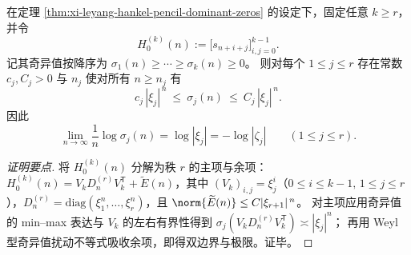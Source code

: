 \begin{theorem}\label{thm:xi-leyang-hankel-singular-slope-detects-moduli}
在定理 \ref{thm:xi-leyang-hankel-pencil-dominant-zeros} 的设定下，固定任意 \(k\ge r\)，并令
\[
H_0^{(k)}(n):=\bigl[s_{n+i+j}\bigr]_{i,j=0}^{k-1}.
\]
记其奇异值按降序为 \(\sigma_1(n)\ge\cdots\ge\sigma_k(n)\ge 0\)。
则对每个 \(1\le j\le r\) 存在常数 \(c_j,C_j>0\) 与 \(n_j\) 使对所有 \(n\ge n_j\) 有
\[
c_j\,|\xi_j|^{\,n}\ \le\ \sigma_j(n)\ \le\ C_j\,|\xi_j|^{\,n}.
\]
因此
\[
\lim_{n\to\infty}\frac{1}{n}\log\sigma_j(n)=\log|\xi_j|=-\log|\zeta_j|\qquad(1\le j\le r).
\]
\end{theorem}
\begin{proof}[证明要点]
将 \(H_0^{(k)}(n)\) 分解为秩 \(r\) 的主项与余项：
\(
H_0^{(k)}(n)=V_k D_n^{(r)} V_k^{\mathsf T}+\widetilde E(n)
\)，其中 \((V_k)_{i,j}=\xi_j^i\)（\(0\le i\le k-1,\,1\le j\le r\)），\(D_n^{(r)}=\mathrm{diag}(\xi_1^n,\dots,\xi_r^n)\)，且 \(\norm{\widetilde E(n)}\le C|\xi_{r+1}|^{\,n}\)。
对主项应用奇异值的 min--max 表达与 \(V_k\) 的左右有界性得到 \(\sigma_j(V_k D_n^{(r)} V_k^{\mathsf T})\asymp |\xi_j|^n\)；
再用 Weyl 型奇异值扰动不等式吸收余项，即得双边界与极限。证毕。
\end{proof}


